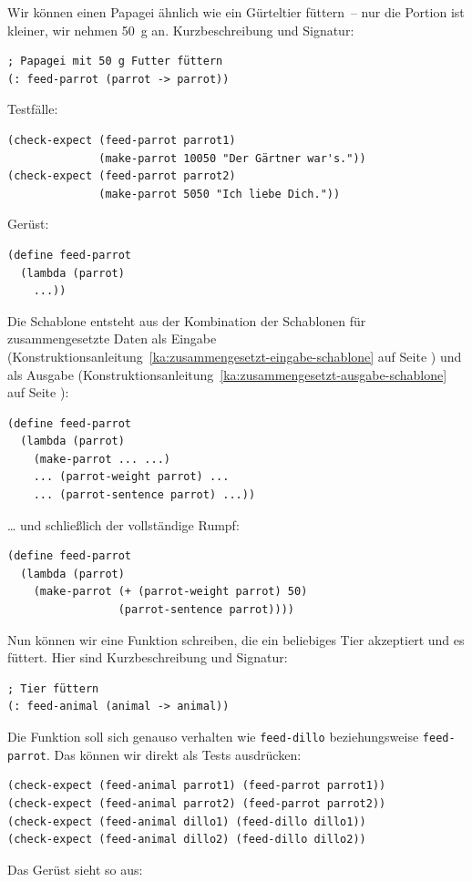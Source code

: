 Wir können einen Papagei ähnlich wie ein Gürteltier füttern~-- nur die
Portion ist kleiner, wir nehmen 50~g an.  Kurzbeschreibung und Signatur:
%
\begin{lstlisting}
; Papagei mit 50 g Futter füttern
(: feed-parrot (parrot -> parrot))
\end{lstlisting}
%
Testfälle:
%
\begin{lstlisting}
(check-expect (feed-parrot parrot1)
              (make-parrot 10050 "Der Gärtner war's."))
(check-expect (feed-parrot parrot2) 
              (make-parrot 5050 "Ich liebe Dich."))
\end{lstlisting}
%
Gerüst:
%
\begin{lstlisting}
(define feed-parrot
  (lambda (parrot)
    ...))
\end{lstlisting}
%
Die Schablone entsteht aus der Kombination der Schablonen für
zusammengesetzte Daten
als Eingabe (Konstruktionsanleitung~\ref{ka:zusammengesetzt-eingabe-schablone} auf
Seite \pageref{ka:zusammengesetzt-eingabe-schablone}) und als Ausgabe
(Konstruktionsanleitung~\ref{ka:zusammengesetzt-ausgabe-schablone} auf
Seite \pageref{ka:zusammengesetzt-ausgabe-schablone}):
%
\begin{lstlisting}
(define feed-parrot
  (lambda (parrot)
    (make-parrot ... ...)
    ... (parrot-weight parrot) ...
    ... (parrot-sentence parrot) ...))
\end{lstlisting}
%
\ldots{} und schließlich der vollständige Rumpf:
%
\begin{lstlisting}
(define feed-parrot
  (lambda (parrot)
    (make-parrot (+ (parrot-weight parrot) 50)
                 (parrot-sentence parrot))))
\end{lstlisting}
%
Nun können wir eine Funktion schreiben, die ein beliebiges Tier
akzeptiert und es füttert.  Hier sind Kurzbeschreibung und Signatur:
%
\begin{lstlisting}
; Tier füttern
(: feed-animal (animal -> animal))
\end{lstlisting}
%
Die Funktion soll sich genauso verhalten wie \lstinline{feed-dillo}
beziehungsweise \lstinline{feed-parrot}.  Das können wir direkt als
Tests ausdrücken:
%
\begin{lstlisting}
(check-expect (feed-animal parrot1) (feed-parrot parrot1))
(check-expect (feed-animal parrot2) (feed-parrot parrot2))
(check-expect (feed-animal dillo1) (feed-dillo dillo1))
(check-expect (feed-animal dillo2) (feed-dillo dillo2))
\end{lstlisting}
%
Das Gerüst sieht so aus:
